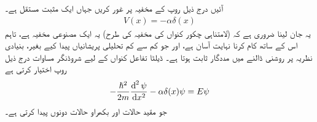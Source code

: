 آئیں درج ذیل روپ کے مخفیہ پر غور کریں جہاں   ایک مثبت مستقل ہے۔
\begin{align}\label{مساوات_شروڈنگر_کنواں_مخفیہ}
V(x)=-\alpha\delta(x)
\end{align}
یہ جان لینا ضروری ہے کہ (لامتناہی چکور  کنواں کی مخفیہ کی طرح) یہ ایک مصنوعی مخفیہ ہے، تاہم اس کے ساتھ کام کرنا نہایت آسان  ہے، اور جو کم سے کم  تحلیلی پریشانیاں پیدا کیے بغیر،  بنیادی نظریہ پر روشنی ڈالنے میں مددگار ثابت ہوتا ہے۔  ڈیلٹا تفاعل کنواں کے لیے شروڈنگر مساوات درج ذیل روپ اختیار کرتی ہے
\begin{align}
-\frac{\hslash^{2}}{2m}\frac{\dif^{\,2}\psi}{\dif{x^{2}}}-\alpha\delta(x)\psi=E\psi
\end{align} 
جو مقید حالات   اور بکھراو حالات   دونوں پیدا کرتی ہے۔

